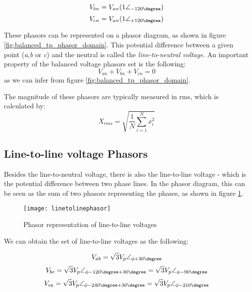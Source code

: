 \begin{equation} \label{eq:balanced_Vbn2}
	V_{bn} = V_{an}(1\angle_{-120\degree})
\end{equation}
\begin{equation} \label{eq:balanced_Vcn2}
	V_{cn} = V_{an}(1\angle_{+120\degree})
\end{equation}

These phasors can be represented on a phasor diagram, as shown in figure \ref{fig:balanced_tp_phasor_domain}. This potential difference between a given point (\emph{a},\emph{b} or \emph{c}) and the neutral is called the \emph{line-to-neutral voltage}. 
An important property of the balanced voltage phasors set is the following:
\begin{equation} \label{eq:balanced_prop1}
	V_{an} + V_{bn} + V_{cn} = 0
\end{equation}
as we can infer from figure \ref{fig:balanced_tp_phasor_domain}.

The magnitude of these phasors are typically measured in \acrfull{rms}, which is calculated by:
\begin{equation} \label{eq:rms}
	X_{rms} = \sqrt{\frac{1}{N}\sum\limits_{i=1}^{N}x_{i}^2}
\end{equation}

\subsection{Line-to-line voltage Phasors}

Besides the line-to-neutral voltage, there is also the line-to-line voltage - which is the potential difference between two phase lines.
In the phasor diagram, this can be seen as the sum of two phasors representing the phases, as shown in figure \ref{fig:line_to_line_phasors}.


\begin{figure}[htbp]
	\centering
	\texttt{[image: linetolinephasor]}
	\caption{Phasor representation of line-to-line voltages}
	\label{fig:line_to_line_phasors}
\end{figure}

We can obtain the set of line-to-line voltages as the following:

\begin{equation} \label{eq:balanced_tpVab}
	V_{ab} = \sqrt{3}V_{p}\angle_{\phi+30\degree}
\end{equation}
\begin{equation} \label{eq:balanced_tpVbc}
	V_{bc} = \sqrt{3}V_{p}\angle_{\phi - 120\degree + 30\degree} = \sqrt{3}V_{p}\angle_{\phi - 90\degree}
\end{equation}
\begin{equation} \label{eq:balanced_tpVca}
	V_{ca} = \sqrt{3}V_{p}\angle_{\phi - 240\degree + 30\degree} = \sqrt{3}V_{p}\angle_{\phi -210\degree} 
\end{equation}


